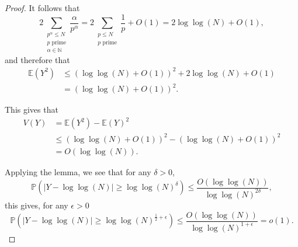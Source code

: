 \documentclass[12pt,reqno]{amsart}
\begin{document}
\begin{proof}
It follows that
\[
    2 \sum _{\substack{ p ^{\alpha} \leq N \\ p \text{ prime} \\ \alpha \in  \mathbb{N} }} \frac{\alpha}{p ^{\alpha}} = 2 \sum _{\substack{ p \leq N \\ p  \text{ prime} }} \frac{1}{p}  + O(1) = 2 \log\log \left( N \right) + O(1)
,\]
and therefore that
\begin{align*}
\mathbb{E} \left( Y^{2} \right) & \leq \left( \log\log \left( N \right) + O(1) \right)^{2} + 2 \log\log \left( N \right) + O(1)\\
& = \left( \log\log \left( N \right)  + O(1) \right) ^{2}. 
\end{align*}


This gives that
\begin{align*}
V(Y) & = \mathbb{E} \left( Y^{2} \right) - \mathbb{E} (Y)^{2}\\
& \leq \left( \log\log \left( N \right) + O(1) \right) ^{2} - \left( \log\log \left( N \right) + O(1) \right) ^{2}\\
& = O \left( \log\log \left( N \right)  \right).
\end{align*}

Applying the lemma, we see that for any \(\delta > 0\),
\[
    \mathbb{P} \left( \left\lvert Y - \log\log \left( N \right)  \right\rvert \geq \log\log \left( N \right) ^{\delta} \right) \leq \frac{O(\log\log \left( N \right) )}{\log\log \left( N \right) ^{2\delta}} 
,\]
this gives, for any \(\epsilon > 0\)
\[
    \mathbb{P} \left( \left\lvert Y - \log\log \left( N \right)  \right\rvert \geq \log\log \left( N \right) ^{\frac{1}{2} + \epsilon} \right) \leq \frac{O(\log\log \left( N \right) )}{\log\log \left( N \right) ^{1 + \epsilon}} = o(1) 
.\]


\end{proof}
\end{document}
